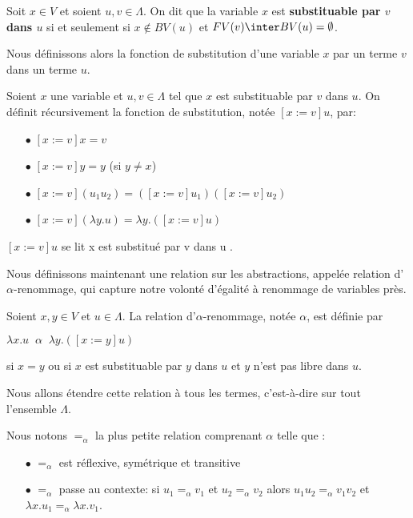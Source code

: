 \begin{definition} 
  Soit $x \in V$ et soient $u, v \in \Lambda$. On dit que la variable $x$ est
  \textbf{substituable par $v$ dans $u$} si et seulement si $x \notin BV(u)$ et
  $FV(v) \inter BV(u) = \emptyset$.
\end{definition}

Nous définissons alors la fonction de substitution d'une variable $x$ par un
terme $v$ dans un terme $u$.

\begin{definition} 
  Soient $x$ une variable et $u, v \in \Lambda$ tel que $x$ est substituable par
  $v$ dans $u$. On définit récursivement la fonction de substitution, notée $[x := v]u$, par:
  \begin{itemize}
  \item[$\bullet$] $[x := v]x = v$
  \item[$\bullet$] $[x := v]y = y$ (si $y \neq x$)
  \item[$\bullet$] $[x := v](u_{1} u_{2}) = ([x := v]u_{1})([x := v]u_{2})$
  \item[$\bullet$] $[x := v](\lambda y . u) = \lambda y . ([x := v]u)$
  \end{itemize}
  $[x := v]u$ se lit \og x est substitué par v dans u \fg.
\end{definition}

Nous définissons maintenant une relation sur les abstractions, appelée relation d'
\textbf{$\alpha$}-renommage, qui capture
notre volonté d'égalité à renommage de variables près.

\begin{definition} 
  Soient $x, y \in V$ et $u \in \Lambda$.
  La relation d'$\alpha$-renommage, notée $\alpha$, est définie par

  \begin{math}
    \lambda x . u \;\; \alpha \;\; \lambda y . ([x := y]u)
  \end{math}

  si $x = y$ ou si $x$ est substituable par $y$ dans $u$ et $y$ n'est pas libre
  dans $u$.
\end{definition}

Nous allons étendre cette relation à tous les termes, c'est-à-dire sur tout l'ensemble $\Lambda$.

Nous notons $=_{\alpha}$ la plus petite relation comprenant $\alpha$ telle que :
\begin{itemize}
  \item[$\bullet$] $=_{\alpha}$ est réflexive, symétrique et transitive
  \item[$\bullet$] $=_{\alpha}$ passe au contexte: si $u_{1} =_{\alpha} v_{1}$
    et $u_{2} =_{\alpha} v_{2}$ alors $u_{1}u_{2} =_{\alpha} v_{1}v_{2}$ et
    $\lambda x . u_{1} =_{\alpha} \lambda x . v_{1}$.
\end{itemize}

